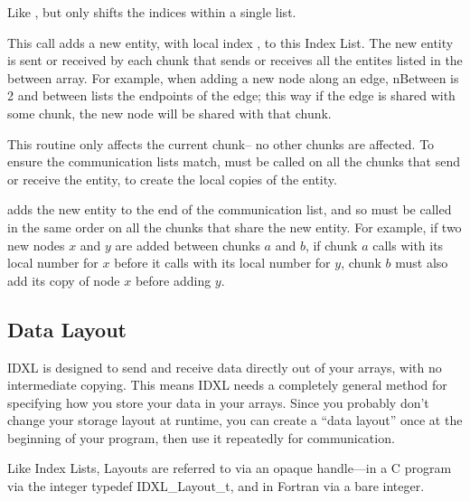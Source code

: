 Like , but only shifts the indices within a single list.



This call adds a new entity, with local index , to this Index List.  The new entity is sent or received by each chunk that sends or receives all the entites listed in the between array.  For example, when adding a new node along an edge, nBetween is 2 and between lists the endpoints of the edge; this way if the edge is shared with some chunk, the new node will be shared with that chunk.

This routine only affects the current chunk-- no other chunks are affected.  To ensure the communication lists match,  must be called on all the chunks that send or receive the entity, to create the local copies of the entity.

 adds the new entity to the end of the communication list, and so must be called in the same order on all the chunks that share the new entity.  For example, if two new nodes $x$ and $y$ are added between chunks $a$ and $b$, if chunk $a$ calls  with its local number for $x$ before it calls  with its local number for $y$, chunk $b$ must also add its copy of node $x$ before adding $y$.


\subsection{Data Layout}
\label{sec:IDXL_Layout}
IDXL is designed to send and receive data directly out of your arrays, with no intermediate copying.  This means IDXL needs a completely general method for specifying how you store your data in your arrays.  Since you probably don't change your storage layout at runtime, you can create a ``data layout'' once at the beginning of your program, then use it repeatedly for communication.

Like Index Lists, Layouts are referred to via an opaque handle---in a C program via the integer typedef IDXL\_Layout\_t, and in Fortran via a bare integer.


